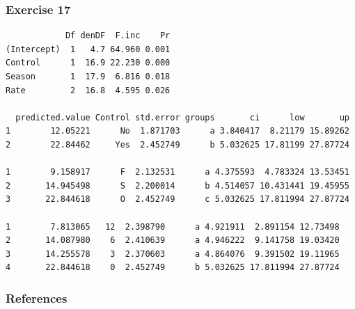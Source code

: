 \begin{frame}[fragile]\frametitle{Exercise 17}
\begin{verbatim}
            Df denDF  F.inc    Pr
(Intercept)  1   4.7 64.960 0.001
Control      1  16.9 22.230 0.000
Season       1  17.9  6.816 0.018
Rate         2  16.8  4.595 0.026

  predicted.value Control std.error groups       ci      low       up
1        12.05221      No  1.871703      a 3.840417  8.21179 15.89262
2        22.84462     Yes  2.452749      b 5.032625 17.81199 27.87724

1        9.158917      F  2.132531      a 4.375593  4.783324 13.53451
2       14.945498      S  2.200014      b 4.514057 10.431441 19.45955
3       22.844618      O  2.452749      c 5.032625 17.811994 27.87724

1        7.813065   12  2.398790      a 4.921911  2.891154 12.73498
2       14.087980    6  2.410639      a 4.946222  9.141758 19.03420
3       14.255578    3  2.370603      a 4.864076  9.391502 19.11965
4       22.844618    0  2.452749      b 5.032625 17.811994 27.87724
\end{verbatim}
\end{frame}


\begin{frame}\frametitle{References}


\end{frame}



